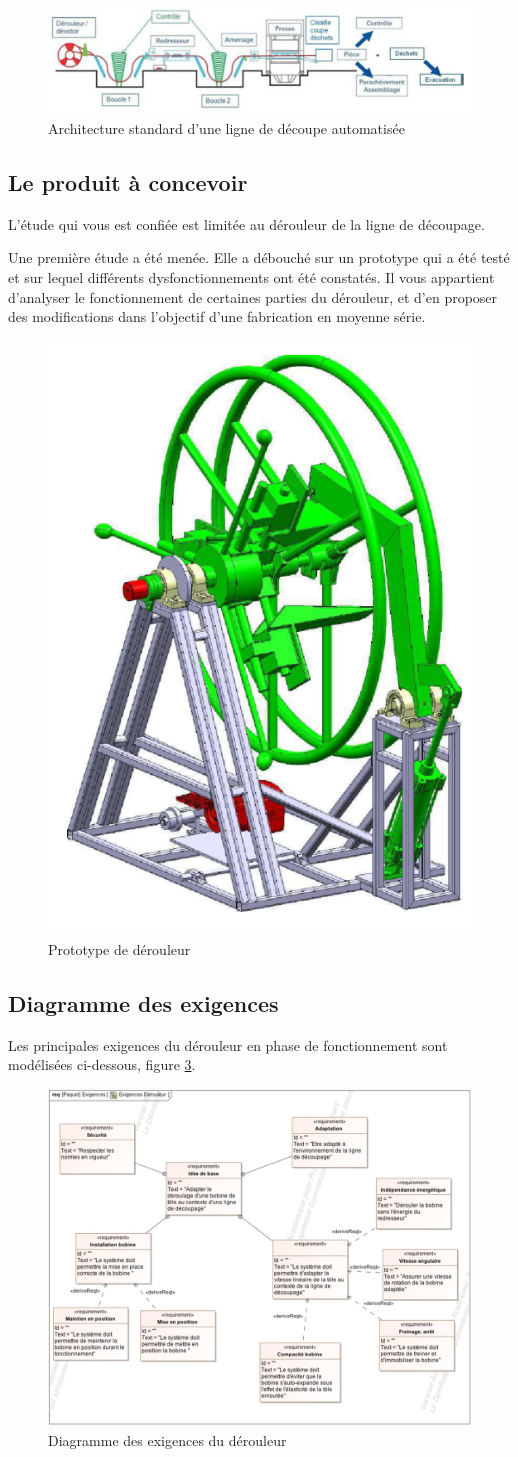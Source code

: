 \begin{figure}[!h]
 \centering\includegraphics[width=0.7\linewidth]{img/fig4}
 \caption{Architecture standard d'une ligne de découpe automatisée}
 \label{fig04}
\end{figure}

\subsection{Le produit à concevoir}

L'étude qui vous est confiée est limitée au dérouleur de la ligne de découpage.

Une première étude a été menée. Elle a débouché sur un prototype qui a été testé et sur lequel différents
dysfonctionnements ont été constatés. Il vous appartient d'analyser le fonctionnement de certaines parties du
dérouleur, et d'en proposer des modifications dans l'objectif d'une fabrication en moyenne série.

\begin{figure}[!h]
 \centering\includegraphics[width=0.2\linewidth]{img/fig5}
 \caption{Prototype de dérouleur}
 \label{fig05}
\end{figure}

\subsection{Diagramme des exigences}

Les principales exigences du dérouleur en phase de fonctionnement sont modélisées ci-dessous, figure \ref{fig06}.

\begin{figure}[!h]
 \centering\includegraphics[width=0.7\linewidth]{img/fig6}
 \caption{Diagramme des exigences du dérouleur}
 \label{fig06}
\end{figure}

